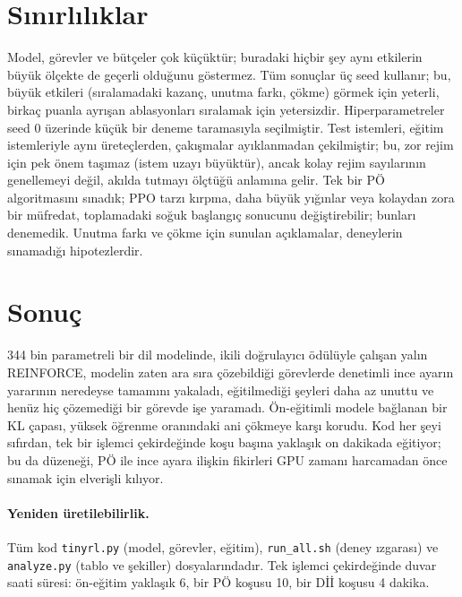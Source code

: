 \documentclass[10pt,twocolumn]{article}
\begin{document}
\section{Sınırlılıklar}
Model, görevler ve bütçeler çok küçüktür; buradaki hiçbir şey aynı etkilerin büyük ölçekte de
geçerli olduğunu göstermez. Tüm sonuçlar üç seed kullanır; bu, büyük etkileri (sıralamadaki kazanç,
unutma farkı, çökme) görmek için yeterli, birkaç puanla ayrışan ablasyonları sıralamak için
yetersizdir. Hiperparametreler seed 0 üzerinde küçük bir deneme taramasıyla seçilmiştir. Test
istemleri, eğitim istemleriyle aynı üreteçlerden, çakışmalar ayıklanmadan çekilmiştir; bu, zor
rejim için pek önem taşımaz (istem uzayı büyüktür), ancak kolay rejim sayılarının genellemeyi
değil, akılda tutmayı ölçtüğü anlamına gelir. Tek bir PÖ algoritmasını sınadık; PPO tarzı kırpma,
daha büyük yığınlar veya kolaydan zora bir müfredat, toplamadaki soğuk başlangıç sonucunu
değiştirebilir; bunları denemedik. Unutma farkı ve çökme için sunulan açıklamalar, deneylerin
sınamadığı hipotezlerdir.

\section{Sonuç}
344 bin parametreli bir dil modelinde, ikili doğrulayıcı ödülüyle çalışan yalın REINFORCE, modelin
zaten ara sıra çözebildiği görevlerde denetimli ince ayarın yararının neredeyse tamamını yakaladı,
eğitilmediği şeyleri daha az unuttu ve henüz hiç çözemediği bir görevde işe yaramadı. Ön-eğitimli
modele bağlanan bir KL çapası, yüksek öğrenme oranındaki ani çökmeye karşı korudu. Kod her şeyi
sıfırdan, tek bir işlemci çekirdeğinde koşu başına yaklaşık on dakikada eğitiyor; bu da düzeneği,
PÖ ile ince ayara ilişkin fikirleri GPU zamanı harcamadan önce sınamak için elverişli kılıyor.

\paragraph{Yeniden üretilebilirlik.} Tüm kod \texttt{tinyrl.py} (model, görevler, eğitim),
\texttt{run\_all.sh} (deney ızgarası) ve \texttt{analyze.py} (tablo ve şekiller) dosyalarındadır.
Tek işlemci çekirdeğinde duvar saati süresi: ön-eğitim yaklaşık 6, bir PÖ koşusu 10, bir Dİİ koşusu
4 dakika.
\end{document}
